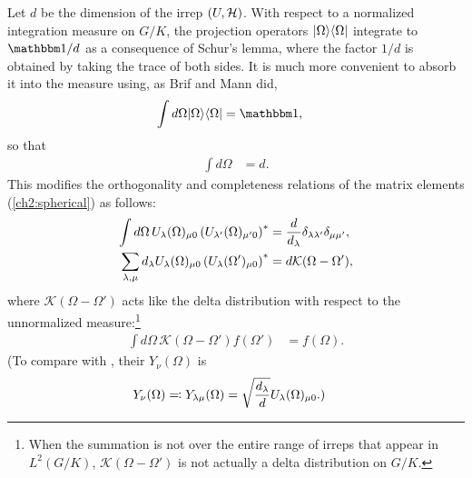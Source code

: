 Let $d$ be the dimension of the irrep $(U,\mathcal{H})$. With respect to a normalized integration measure on $G/K$, the projection operators ${\left\vert{\Omega}\right\rangle}{\left\langle{\Omega}\right\vert}$ integrate to $\id/d$ as a consequence of Schur's lemma, where the factor $1/d$ is obtained by taking the trace of both sides. It is much more convenient to absorb it into the measure using, as Brif and Mann did,
\begin{align}
	\int d\Omega \ket{\Omega}\bra{\Omega} &= \id,
\end{align}
so that
\begin{align}
	\int d\Omega &= d.
\end{align}
This modifies the orthogonality and completeness relations of the matrix elements (\autoref{ch2:spherical}) as follows:
\begin{align}
\int d\Omega\, \rep_{\lambda}(\Omega)_{\mu 0} \left( \rep_{\lambda'}(\Omega)_{\mu' 0} \right)^* &= \frac{d}{d_{\lambda}} \delta_{\lambda\lambda'} \delta_{\mu\mu'}, \label{thm:orthogonality-unnormalized} \\
\sum_{\lambda,\mu} d_{\lambda} \rep_{\lambda}(\Omega)_{\mu 0} \left( \rep_{\lambda}(\Omega')_{\mu 0} \right)^* &= d\mathcal{K}(\Omega - \Omega'), \label{thm:completeness-unnormalized}
\end{align}
where $\mathcal{K}(\Omega - \Omega')$ acts like the delta distribution with respect to the unnormalized measure:\footnote{When the summation is not over the entire range of irreps that appear in $L^2(G/K)$, $\mathcal{K}(\Omega - \Omega')$ is not actually a delta distribution on $G/K$.}
\begin{align}
	\int d\Omega\, \mathcal{K}(\Omega - \Omega') f(\Omega') &= f(\Omega).
\end{align}
(To compare with \cite{brif_phase-space_1999}, their $Y_{\nu}(\Omega)$ is
\begin{align}
	Y_{\nu}(\Omega) \eqqcolon Y_{\lambda \mu} (\Omega) &= \sqrt{\frac{d_{\lambda}}{d}} U_{\lambda}(\Omega)_{\mu 0}.)
\end{align}


